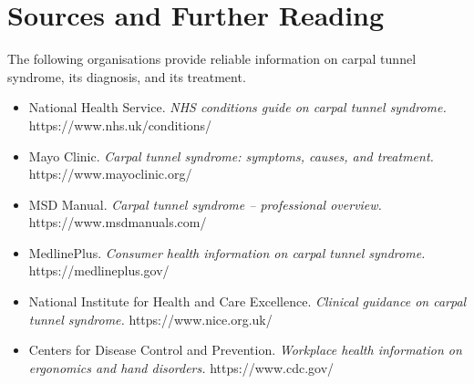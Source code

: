 \section*{Sources and Further Reading}
The following organisations provide reliable information on carpal tunnel syndrome, its diagnosis, and its treatment.

\begin{itemize}
    \item National Health Service. \textit{NHS conditions guide on carpal tunnel syndrome.} https://www.nhs.uk/conditions/
    \item Mayo Clinic. \textit{Carpal tunnel syndrome: symptoms, causes, and treatment.} https://www.mayoclinic.org/
    \item MSD Manual. \textit{Carpal tunnel syndrome -- professional overview.} https://www.msdmanuals.com/
    \item MedlinePlus. \textit{Consumer health information on carpal tunnel syndrome.} https://medlineplus.gov/
    \item National Institute for Health and Care Excellence. \textit{Clinical guidance on carpal tunnel syndrome.} https://www.nice.org.uk/
    \item Centers for Disease Control and Prevention. \textit{Workplace health information on ergonomics and hand disorders.} https://www.cdc.gov/
\end{itemize}

